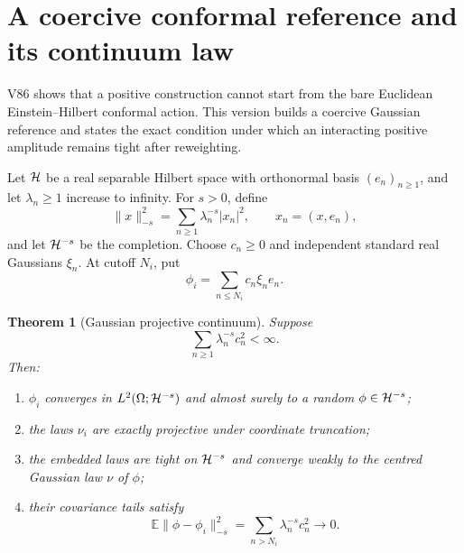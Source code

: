 \documentclass[11pt]{article}
\newtheorem{theorem}{Theorem}[section]
\begin{document}

\section{A coercive conformal reference and its continuum law}
\label{sec:v11v87}

V86 shows that a positive construction cannot start from the bare
Euclidean Einstein--Hilbert conformal action.  This version builds a
coercive Gaussian reference and states the exact condition under
which an interacting positive amplitude remains tight after
reweighting.

Let \({\cal H}\) be a real separable Hilbert space with orthonormal
basis \((e_n)_{n\ge1}\), and let \(\lambda_n\ge1\) increase to
infinity.  For \(s>0\), define
\[
 \|x\|_{-s}^2=\sum_{n\ge1}\lambda_n^{-s}|x_n|^2,\qquad
 x_n=(x,e_n),                                                \tag{87.1}
\]
and let \({\cal H}^{-s}\) be the completion.  Choose \(c_n\ge0\) and
independent standard real Gaussians \(\xi_n\).  At cutoff \(N_i\), put
\[
                       \phi_i=\sum_{n\le N_i}c_n\xi_ne_n.     \tag{87.2}
\]

\begin{theorem}[Gaussian projective continuum]
\label{thm:v11v87-gaussian}
Suppose
\[
                              \sum_{n\ge1}\lambda_n^{-s}c_n^2
                              <\infty.                        \tag{87.3}
\]
Then:
\begin{enumerate}
\item \(\phi_i\) converges in
      \(L^2(\Omega;{\cal H}^{-s})\) and almost surely to a random
      \(\phi\in{\cal H}^{-s}\);
\item the laws \(\nu_i\) are exactly projective under coordinate
      truncation;
\item the embedded laws are tight on \({\cal H}^{-s}\) and converge
      weakly to the centred Gaussian law \(\nu\) of \(\phi\);
\item their covariance tails satisfy
\[
 \mathbb E\|\phi-\phi_i\|_{-s}^2
       =\sum_{n>N_i}\lambda_n^{-s}c_n^2\longrightarrow0.     \tag{87.4}
\]
\end{enumerate}
\end{theorem}
\end{document}
